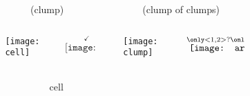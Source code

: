 \begin{figure}
\begin{columns}
\begin{column}{0.27\textwidth}
\end{column}
\begin{column}{0.07\textwidth}
\end{column}
\begin{column}{0.27\textwidth}
\centering
(clump)
\end{column}
\begin{column}{0.07\textwidth}
\end{column}
\begin{column}{0.27\textwidth}
\centering
(clump of clumps)
\end{column}
\end{columns}
\vspace{2ex}
\begin{columns}
\begin{column}{0.05\textwidth}
\begin{subfigure}[b]{\textwidth}
\caption{}
\label{fig:simulated}
\end{subfigure}
\end{column}
\begin{column}{0.27\textwidth}
\texttt{[image: cell]}
\end{column}
\begin{column}{0.07\textwidth}
{\Large$\underset{\phantom{\checkmark}}{\overset{\checkmark}{\texttt{[image: arrow]}}}$}
\end{column}
\begin{column}{0.27\textwidth}
\texttt{[image: clump]}
\end{column}
\begin{column}{0.07\textwidth}
{\Large$\underset{\phantom{?}}{\overset{\only<1,2>{?}\only<3>{\phantom{?}}}{\texttt{[image: arrow]}}}$}
\end{column}
\end{columns}
\vspace{1ex}
\begin{columns}
\begin{column}{0.05\textwidth}
\end{column}
\begin{column}{0.27\textwidth}
\centering
cell
\end{column}
\begin{column}{0.07\textwidth}

\end{column}
\end{columns}
\end{figure}
